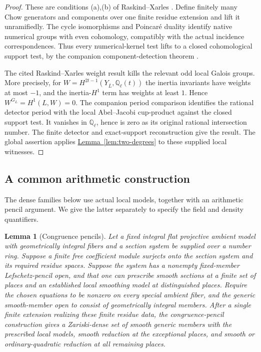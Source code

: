 \documentclass[11pt,a4paper]{article}
\newtheorem{lemma}[theorem]{Lemma}
\theoremstyle{definition}
\theoremstyle{remark}\newtheorem{remark}[theorem]{Remark}
\numberwithin{equation}{section}
\newcommand{\Q}{\mathbb Q}\newcommand{\R}{\mathbb R}\newcommand{\C}{\mathbb C}
\newcommand{\lemref}[1]{\hyperref[#1]{\textcolor{resultlink}{Lemma~\ref*{#1}}}}
\begin{document}
\begin{proof}
These are conditions (a),(b) of Raskind--Xarles
\cite[Definition 1]{RX}. Define finitely many Chow generators and
components over one finite residue extension and lift it
unramifiedly. The cycle isomorphisms and Poincar\'e duality identify
native numerical groups with even cohomology, compatibly with the
actual incidence correspondences. Thus every numerical-kernel
test lifts to a closed cohomological support test, by the companion
component-detection theorem \cite{InternalDegenerate}.

The cited Raskind--Xarles weight result kills the relevant odd
local Galois groups. More precisely, for
$W=H^{2t-1}(Y_{\bar L},\Q_\ell(t))$ the inertia invariants have
weights at most $-1$, and the inertia-$H^1$ term has weights at
least $1$. Hence $W^{G_L}=H^1(L,W)=0$. The companion period
comparison identifies the rational detector period with the
local Abel--Jacobi cup-product against the closed support test.
It vanishes in $\Q_\ell$, hence is zero as its original rational
intersection number. The finite detector and exact-support
reconstruction give the result. The global assertion applies
\lemref{lem:two-degrees} to these supplied local witnesses.
\end{proof}

\subsection{A common arithmetic construction}\label{sub:arithmetic-construction}

The dense families below use actual local models, together with an
arithmetic pencil argument. We give the latter separately to specify
the field and density quantifiers.

\begin{lemma}[Congruence pencils]\label{lem:congruence-pencils}
Let a fixed integral flat projective ambient model with geometrically
integral fibers and a section system be supplied over a number
ring. Suppose a finite free coefficient module surjects
onto the section system and its required residue spaces. Suppose
the system has a nonempty fixed-member Lefschetz-pencil open, and
that one can prescribe smooth sections at a finite set of places
and an established local smoothing model at distinguished places.
Require the chosen equations to be nonzero on every special
ambient fiber, and the generic smooth-member open to consist of
geometrically integral members.
After a single finite extension realizing these finite residue data,
the congruence-pencil construction gives a Zariski-dense set of
smooth generic members with the prescribed local models, smooth
reduction at the exceptional places, and smooth or ordinary-quadratic
reduction at all remaining places.
\end{lemma}
\end{document}
